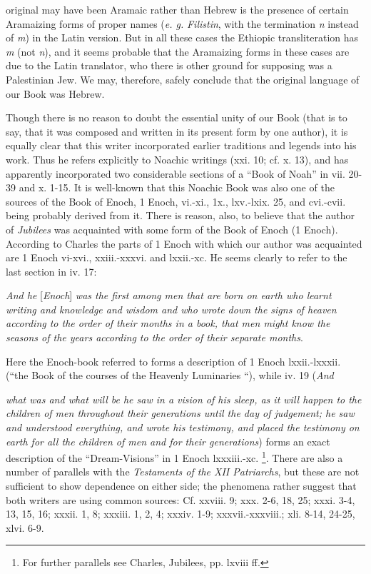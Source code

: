 original may have been Aramaic rather than Hebrew is the presence of certain Aramaizing forms of proper names (\emph{e. g.} \emph{Filistin}, with the termination \emph{n} instead of \emph{m}) in the Latin version. But in all these cases the Ethiopic transliteration has \emph{m} (not \emph{n}), and it seems probable that the Aramaizing forms in these cases are due to the Latin translator, who there is other ground for supposing was a Palestinian Jew. We may, therefore, safely conclude that the original language of our Book was Hebrew.


Though there is no reason to doubt the essential unity of our Book (that is to say, that it was composed and written in its present form by one author), it is equally clear that this writer incorporated earlier traditions and legends into his work. Thus he refers explicitly to Noachic writings (xxi. 10; cf. x. 13), and has apparently incorporated two considerable sections of a ``Book of Noah'' in vii. 20-39 and x. 1-15. It is well-known that this Noachic Book was also one of the sources of the Book of Enoch, 1 Enoch, vi.-xi., 1x., lxv.-lxix. 25, and cvi.-cvii. being probably derived from it. There is reason, also, to believe that the author of \emph{Jubilees} was acquainted with some form of the Book of Enoch (1 Enoch). According to Charles the parts of 1 Enoch with which our author was acquainted are 1 Enoch vi-xvi., xxiii.-xxxvi. and lxxii.-xc. He seems clearly to refer to the last section in iv. 17:

\emph{And he} [\emph{Enoch}] \emph{was the first among men that are born on earth who learnt writing and knowledge and wisdom and who wrote down the signs of heaven according to the order of their months in a book, that men might know the seasons of the years according to the order of their separate months}.

Here the Enoch-book referred to forms a description of 1 Enoch lxxii.-lxxxii. (``the Book of the courses of the Heavenly Luminaries ``), while iv. 19 (\emph{And}

\emph{what was and what will be he saw in a vision of his sleep, as it will happen to the children of men throughout their generations until the day of judgement; he saw and understood everything, and wrote his testimony, and placed the testimony on earth for all the children of men and for their generations}) forms an exact description of the ``Dream-Visions'' in 1 Enoch lxxxiii.-xc. \footnote{For further parallels see Charles, Jubilees, pp. lxviii ff.}. There are also a number of parallels with the \emph{Testaments of the XII Patriarchs}, but these are not sufficient to show dependence on either side; the phenomena rather suggest that both writers are using common sources: Cf. xxviii. 9; xxx. 2-6, 18, 25; xxxi. 3-4, 13, 15, 16; xxxii. 1, 8; xxxiii. 1, 2, 4; xxxiv. 1-9; xxxvii.-xxxviii.; xli. 8-14, 24-25, xlvi. 6-9.

